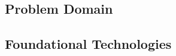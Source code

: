\placeholder

\subsection{Problem Domain}
\placeholder

\subsection{Foundational Technologies}
\placeholder
